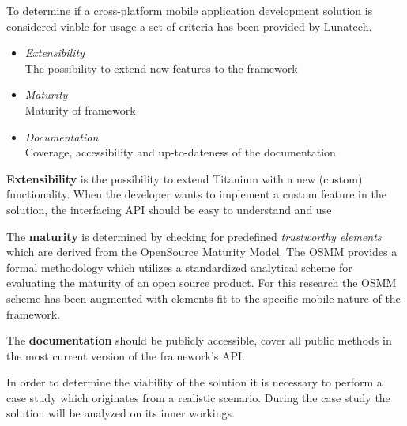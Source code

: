 

To determine if a cross-platform mobile application development solution is considered viable for usage a set of criteria has been provided by Lunatech.
\begin{itemize}
	\item \emph{Extensibility}\\
	The possibility to extend new features to the framework
	\item \emph{Maturity}\\ 
	Maturity of framework
	\item \emph{Documentation}\\
	Coverage, accessibility and up-to-dateness of the documentation
\end{itemize}


{\bf Extensibility} is the possibility to extend Titanium with a new (custom) functionality. 
When the developer wants to implement a custom feature in the solution, the interfacing API should be easy to understand and use

The {\bf maturity} is determined by checking for predefined \emph{trustworthy elements} which are derived from the OpenSource Maturity Model\cite{Wikipedia2011}. The OSMM provides a formal methodology which utilizes a standardized analytical scheme for evaluating the maturity of an open source product. For this research the OSMM scheme has been augmented with elements fit to the specific mobile nature of the framework.

The {\bf documentation} should be publicly accessible, cover all public methods in the most current version of the framework's API.

%
%

In order to determine the viability of the solution it is necessary to perform a case study which originates from a realistic scenario. During the case study the solution will be analyzed on its inner workings. 

